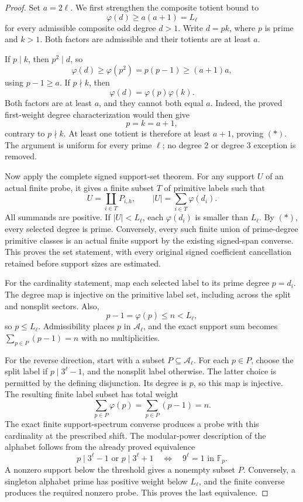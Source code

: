 \documentclass[11pt]{article}
\begin{document}
\begin{proof}
Set \(a=2\ell\). We first strengthen the composite
totient bound to
\[
                \varphi(d)\ge a(a+1)=L_\ell
 \tag{*}
\]
for every admissible composite odd degree \(d>1\).
Write \(d=pk\), where \(p\) is prime and \(k>1\).
Both factors are admissible and their totients are
at least \(a\).

If \(p\mid k\), then \(p^2\mid d\), so
\[
       \varphi(d)\ge\varphi(p^2)
                    =p(p-1)\ge(a+1)a,
\]
using \(p-1\ge a\). If \(p\nmid k\), then
\[
                     \varphi(d)=\varphi(p)\varphi(k).
\]
Both factors are at least \(a\), and they cannot both
equal \(a\). Indeed, the proved first-weight degree
characterization would then give
\[
                              p=k=a+1,
\]
contrary to \(p\nmid k\). At least one totient is
therefore at least \(a+1\), proving \((*)\).
The argument is uniform for every prime \(\ell\);
no degree \(2\) or degree \(3\) exception is removed.

Now apply the complete signed support-set theorem.
For any support \(U\) of an actual finite probe, it gives
a finite subset \(T\) of primitive labels such that
\[
                U=\coprod_{i\in T}P_{i,h},
       \qquad |U|=\sum_{i\in T}\varphi(d_i).
\]
All summands are positive. If \(|U|<L_\ell\), each
\(\varphi(d_i)\) is smaller than \(L_\ell\).
By \((*)\), every selected degree is prime.
Conversely, every such finite union of prime-degree
primitive classes is an actual finite support by the
existing signed-span converse. This proves the set
statement, with every original signed coefficient
cancellation retained before support sizes are estimated.

For the cardinality statement, map each selected label
to its prime degree \(p=d_i\).
The degree map is injective on the primitive label set,
including across the split and nonsplit sectors.
Also,
\[
                  p-1=\varphi(p)\le n<L_\ell,
\]
so \(p\le L_\ell\). Admissibility places \(p\) in
\(\mathcal A_\ell\), and the exact support sum becomes
\(\sum_{p\in P}(p-1)=n\) with no multiplicities.

For the reverse direction, start with a subset
\(P\subseteq\mathcal A_\ell\).
For each \(p\in P\), choose the split label if
\(p\mid3^\ell-1\), and the nonsplit label otherwise.
The latter choice is permitted by the defining
disjunction. Its degree is \(p\), so this map is
injective. The resulting finite label subset has
total weight
\[
                        \sum_{p\in P}\varphi(p)
                       =\sum_{p\in P}(p-1)=n.
\]
The exact finite support-spectrum converse produces
a probe with this cardinality at the prescribed shift.
The modular-power description of the alphabet follows
from the already proved equivalence
\[
      p\mid3^\ell-1\text{ or }p\mid3^\ell+1
                    \quad\Longleftrightarrow\quad
                            9^\ell=1\text{ in }\mathbb F_p.
\]
A nonzero support below the threshold gives a nonempty
subset \(P\). Conversely, a singleton alphabet prime
has positive weight below \(L_\ell\), and the finite
converse produces the required nonzero probe.
This proves the last equivalence.


\end{proof}
\end{document}
